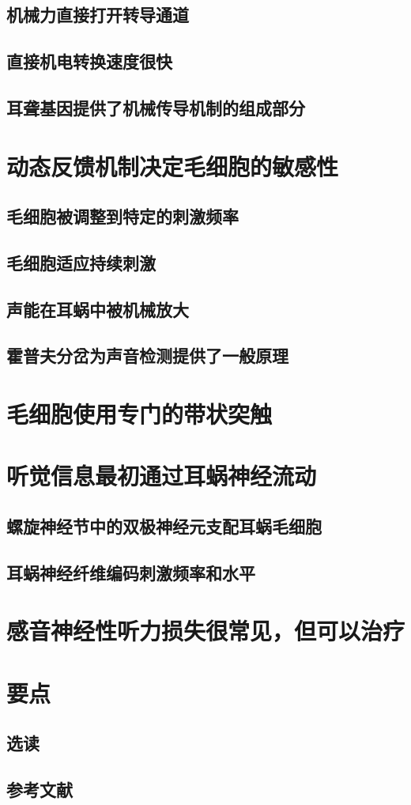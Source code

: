 \subsection{机械力直接打开转导通道}
\subsection{直接机电转换速度很快}
\subsection{耳聋基因提供了机械传导机制的组成部分}

\section{动态反馈机制决定毛细胞的敏感性}
\subsection{毛细胞被调整到特定的刺激频率}
\subsection{毛细胞适应持续刺激}
\subsection{声能在耳蜗中被机械放大}
\subsection{霍普夫分岔为声音检测提供了一般原理}

\section{毛细胞使用专门的带状突触}

\section{听觉信息最初通过耳蜗神经流动}
\subsection{螺旋神经节中的双极神经元支配耳蜗毛细胞}
\subsection{耳蜗神经纤维编码刺激频率和水平}

\section{感音神经性听力损失很常见，但可以治疗}

\section{要点}
\subsection{选读}
\subsection{参考文献}